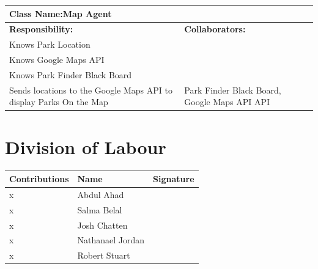 \documentclass[titlepage,12pt]{article}
\begin{document}
 				\begin{table}[H]
 					\centering
 					\begin{tabular}{|p{5cm}|p{5cm}|}
 						\hline 
 						\multicolumn{2}{|l|}{\textbf{Class Name:Map Agent}} \\
 						\hline
 						\textbf{Responsibility:} & \textbf{Collaborators:} \\
 						\hline
 						Knows Park Location & \\
 						\hline
 						Knows Google Maps API & \\
 						\hline
 						Knows Park Finder Black Board & \\
 						\hline
 				Sends locations to the Google Maps API to display Parks On the Map  &	Park Finder Black Board, Google Maps API API \\
 						\hline
 					\end{tabular}
 				\end{table}		
 
 				

\newpage
\appendix
\section{Division of Labour}%
\label{sec:division_of_labour}

\begin{table}[H]
\vspace{-0.06in}
\begin{center}
\setlength{\extrarowheight}{4.0pt}
\begin{tabular}{m{} m{} m{}} 
\hline
\textbf{Contributions} & \textbf{Name} & \textbf{Signature}\\
\hline
x & Abdul Ahad & \\
\hline
x & Salma Belal & \\
\hline
x & Josh Chatten & \\
\hline
x & Nathanael Jordan  & \\
\hline
x & Robert Stuart & \\
\hline
\end{tabular}
\end{center}
\label{divOfLabour}
\end{table}

\end{document}
